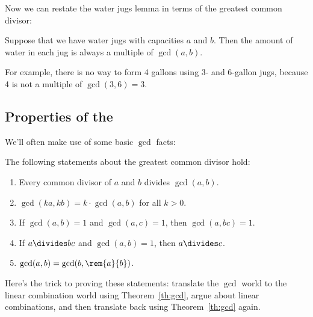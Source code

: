 Now we can restate the water jugs lemma in terms of the greatest
common divisor:
\begin{corollary}
\label{cor:waterjugs}
Suppose that we have water jugs with capacities $a$ and $b$.  Then the
amount of water in each jug is always a multiple of $\gcd(a, b)$.
\end{corollary}

For example, there is no way to form 4 gallons using 3- and 6-gallon
jugs, because 4 is not a multiple of $\gcd(3, 6) = 3$.

\subsection{Properties of the }

We'll often make use of some basic $\gcd$ facts:

\begin{lemma} The following statements about the greatest common divisor hold:
\label{lem:gcd}
%
\begin{enumerate}
\item Every common divisor of $a$ and $b$ divides $\gcd(a, b)$.
\item\label{gcd2} $\gcd(k a, k b) = k \cdot \gcd(a, b)$ for all $k > 0$.
\item\label{gcd3} If $\gcd(a, b) = 1$ and $\gcd(a, c) = 1$, then $\gcd(a, bc) =
1$.
\item\label{gcd4} If $a \divides b c$ and $\gcd(a, b) = 1$, then $a \divides c$.
\item\label{gcd5} $\gcd(a, b) = \gcd(b, \rem{a}{b})$.
\end{enumerate}
\end{lemma}

Here's the trick to proving these statements: translate the $\gcd$
world to the linear combination world using Theorem~\ref{th:gcd},
argue about linear combinations, and then translate back using
Theorem~\ref{th:gcd} again.

